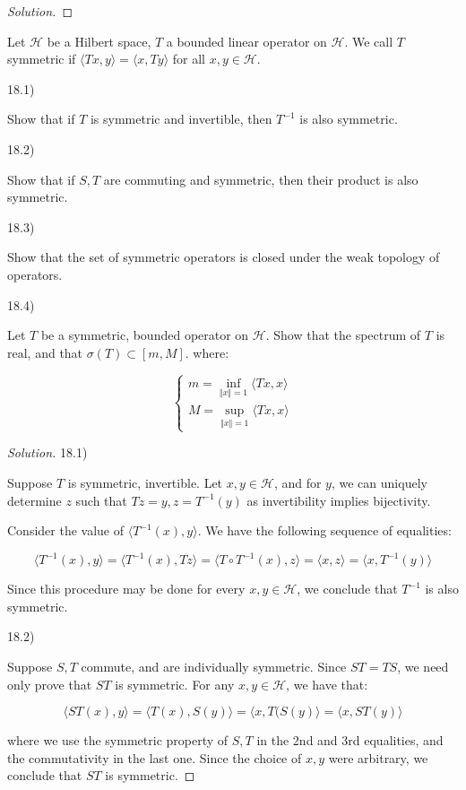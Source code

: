 \documentclass[10pt]{article}
\newenvironment{problem}[2][]{\begin{trivlist}
\item[\hskip \labelsep {\bfseries #1}\hskip \labelsep {\bfseries #2.}]}{\end{trivlist}}
\begin{document}
\begin{proof}[Solution]


\end{proof}

\begin{problem}{Question 18}

Let $\mathcal{H}$ be a Hilbert space, $T$ a bounded linear operator on $\mathcal{H}$. We call $T$ symmetric if $\langle Tx, y \rangle = \langle  x, Ty\rangle$ for all $x, y \in \mathcal{H}$. 

18.1)

Show that if $T$ is symmetric and invertible, then $T^{-1}$ is also symmetric.

18.2)

Show that if $S, T$ are commuting and symmetric, then their product is also symmetric.

18.3)

Show that the set of symmetric operators is closed under the weak topology of operators.

18.4)

Let $T$ be a symmetric, bounded operator on $\mathcal{H}$. Show that the spectrum of $T$ is real, and that $\sigma(T) \subset [m, M]$. where:

$$ \begin{cases} m = \inf_{\Vert x \Vert = 1}\langle Tx , x \rangle \\ M = \sup_{\Vert x \Vert = 1} \langle Tx, x \rangle \end{cases}$$

\end{problem}

\begin{proof}[Solution]

18.1)

Suppose $T$ is symmetric, invertible. Let $x, y \in \mathcal{H}$, and for $y$, we can uniquely determine $z$ such that $Tz = y, z = T^{-1}(y)$ as invertibility implies bijectivity.

Consider the value of $\langle T^{-1}(x), y \rangle$. We have the following sequence of equalities:

$$ \langle T^{-1}(x), y \rangle = \langle T^{-1}(x), Tz \rangle = \langle T \circ T^{-1}(x), z \rangle = \langle x, z \rangle = \langle x, T^{-1}(y) \rangle$$

Since this procedure may be done for every $x, y \in \mathcal{H}$, we conclude that $T^{-1}$ is also symmetric.

18.2)

Suppose $S, T$ commute, and are individually symmetric. Since $ST = TS$, we need only prove that $ST$ is symmetric. For any $x, y \in \mathcal{H}$, we have that:

$$ \langle ST(x), y \rangle = \langle T(x), S(y) \rangle = \langle x, T (S(y) \rangle = \langle x, ST(y) \rangle $$

where we use the symmetric property of $S, T$ in the 2nd and 3rd equalities, and the commutativity in the last one. Since the choice of $x, y $ were arbitrary, we conclude that $ST$ is symmetric.

\end{proof}
\end{document}
